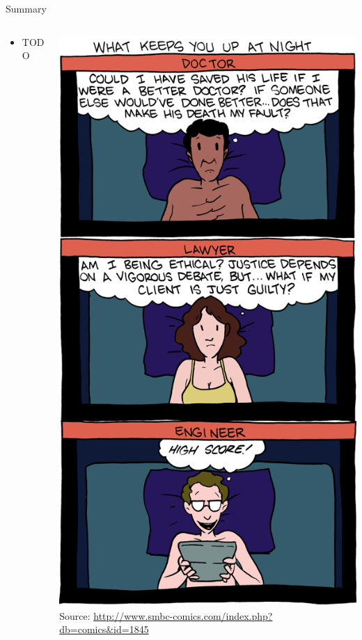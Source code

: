 \begin{frame}{Summary}
  \begin{columns}[c]
    \begin{column}{0.55\textwidth}
      \begin{itemize}
      \item TODO
      \end{itemize}
    \end{column}
    \begin{column}{0.45\textwidth}
      \begin{center}
        \includegraphics[scale=0.2]{figures/smbc}\\
        \tiny{Source: \url{http://www.smbc-comics.com/index.php?db=comics&id=1845}}
      \end{center}
    \end{column}
  \end{columns}
\end{frame}


